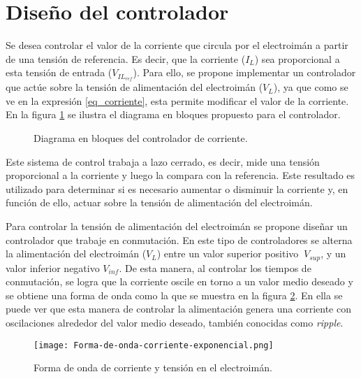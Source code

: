 \section{Diseño del controlador}

Se desea controlar el valor de la corriente que circula por el electroimán a partir de una tensión de referencia. Es decir, que la corriente ($I_L$) sea proporcional a esta tensión de entrada ($V_{IL_{ref}}$). Para ello, se propone implementar un controlador que actúe sobre la tensión de alimentación del electroimán ($V_L$), ya que como se ve en la expresión \ref{eq_corriente}, esta permite modificar el valor de la corriente. En la figura \ref{fig:img_diagrama_bloques_basico_cc} se ilustra el diagrama en bloques propuesto para el controlador.


\begin{figure}[H]
	\centering
	
	\caption{Diagrama en bloques del controlador de corriente.}
	\label{fig:img_diagrama_bloques_basico_cc}
\end{figure}

Este sistema de control trabaja a lazo cerrado, es decir, mide una tensión proporcional a la corriente y luego la compara con la referencia. Este resultado es utilizado para determinar si es necesario aumentar o disminuir la corriente y, en función de ello, actuar sobre la tensión de alimentación del electroimán.

Para controlar la tensión de alimentación del electroimán se propone diseñar un controlador que trabaje en conmutación. En este tipo de controladores se alterna la alimentación del electroimán ($V_L$) entre un valor superior positivo $\ V_{sup}$, y un valor inferior negativo $V_{inf}$. De esta manera, al controlar los tiempos de conmutación, se logra que la corriente oscile en torno a un valor medio deseado y se obtiene una forma de onda como la que se muestra en la figura  \ref{fig:img_corriente_exponencial}. En ella se puede ver que esta manera de controlar la alimentación genera una corriente con oscilaciones alrededor del valor medio deseado, también conocidas como \textsl{ripple}. 

\begin{figure}[H]
	\centering
	\texttt{[image: Forma-de-onda-corriente-exponencial.png]}
	\caption{Forma de onda de corriente y tensión en el electroimán.}
	\label{fig:img_corriente_exponencial}
\end{figure}

